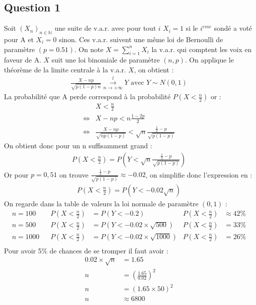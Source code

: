 \documentclass[10pt,a4paper,twoside]{article}
\begin{document}
\subsection{Question 1}
Soit $(X_{n})_{n\in \mathbb{N}}$ une suite de v.a.r. avec pour tout $i$ $X_{i} = 1$ si le $i^{eme}$ sondé a voté pour A et $X_{i}=0$ sinon. Ces v.a.r. suivent une même loi de Bernoulli de paramètre $(p=0.51)$. On note $X=\sum_{i=1}^{n}X_{i}$ la v.a.r. qui comptent les voix en faveur de A. $X$ suit une loi binomiale de paramètre $(n,p)$. On applique le théorème de la limite centrale à la v.a.r. $X$, on obtient :
\begin{align*}
\frac{X-np}{\sqrt{p(1-p)n}} \overset{l}{\underset{n\rightarrow+\infty}{\longrightarrow}} Y \text{ avec }Y\sim N(0,1)
\end{align*} 
La probabilité que A perde correspond à la probabilité $P\left(X<\frac{n}{2}\right)$ or :
\begin{align*}
&X<\frac{n}{2}\\
\Leftrightarrow & X-np < n\frac{1-2p}{2}\\
\Leftrightarrow & \frac{X-np}{\sqrt{np(1-p)}} < \sqrt{n}\frac{\frac{1}{2}-p}{\sqrt{p(1-p)}}
\end{align*}
On obtient donc pour un n suffisamment grand :
\begin{align*}
P\left(X<\frac{n}{2}\right) = P\left(Y<\sqrt{n}\frac{\frac{1}{2}-p}{\sqrt{p(1-p)}}\right)
\end{align*}
Or pour $p=0,51$ on trouve $\frac{\frac{1}{2}-p}{\sqrt{p(1-p)}}\approx -0.02$, on simplifie donc l'expression en :
\begin{align*}
P\left(X<\frac{n}{2}\right) = P\left(Y<-0.02\sqrt{n}\right)
\end{align*}
On regarde dans la table de valeurs la loi normale de paramètre $(0,1)$ :
\begin{align*}
n=100 && P\left(X<\frac{n}{2}\right) &= P\left(Y<-0.2\right) & P\left(X<\frac{n}{2}\right) &\approx 42\% \\
n=500 && P\left(X<\frac{n}{2}\right) &= P\left(Y<-0.02\times\sqrt{500}\right) & P\left(X<\frac{n}{2}\right) &= 33\%\\
n=1000 && P\left(X<\frac{n}{2}\right) &= P\left(Y<-0.02\times\sqrt{1000}\right) & P\left(X<\frac{n}{2}\right) &= 26\%\\
\end{align*}
Pour avoir 5\% de chances de se tromper il faut avoir : 
\begin{align*}
0.02\times\sqrt{n} &= 1.65\\
n &= \left(\frac{1.65}{0.02}\right)^{2}\\
n &= (1.65\times50)^{2}\\
n &\approx 6800
\end{align*}
\end{document}
